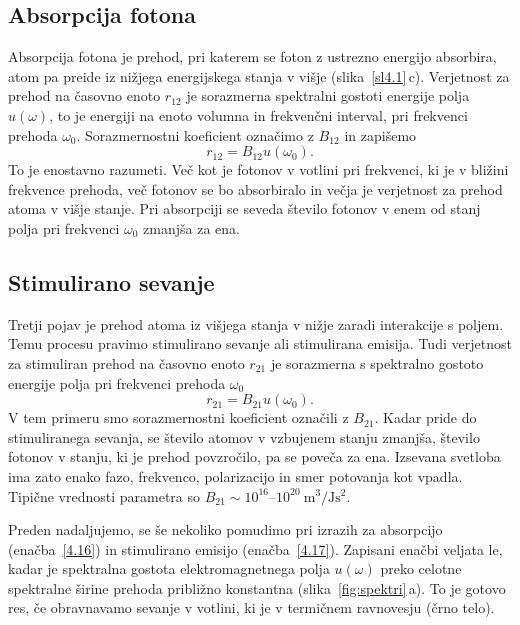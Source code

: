 \subsection*{Absorpcija fotona}
Absorpcija fotona je prehod, pri katerem se foton 
z ustrezno energijo absorbira, atom pa preide iz nižjega energijskega stanja v višje (slika~\ref{sl4.1}\,c). 
Verjetnost za prehod na časovno enoto $r_{12}$ je sorazmerna 
spektralni gostoti energije polja $u(\omega)$, to je
energiji na enoto volumna in frekvenčni interval, 
pri frekvenci prehoda $\omega_{0}$. Sorazmernostni koeficient označimo z $B_{12}$ in 
zapišemo
\begin{equation}
r_{12}=B_{12}u(\omega_{0}).
\label{4.16}
\end{equation}
To je enostavno razumeti. Več kot je fotonov v votlini pri frekvenci, ki je
v bližini frekvence prehoda, več fotonov se bo absorbiralo in večja je 
verjetnost za prehod atoma v višje stanje. Pri absorpciji se
seveda število fotonov v enem od stanj polja pri frekvenci
$\omega_{0}$ zmanjša za ena.

\subsection*{Stimulirano sevanje}
Tretji pojav je prehod atoma iz višjega stanja v nižje zaradi interakcije
s poljem. Temu procesu pravimo stimulirano sevanje ali 
stimulirana emisija. Tudi verjetnost za stimuliran prehod na časovno enoto $r_{21}$ 
je sorazmerna s spektralno gostoto energije polja pri frekvenci prehoda $\omega_{0}$
\begin{equation}
r_{21}=B_{21}u(\omega_{0}).
\label{4.17}
\end{equation}
V tem primeru smo sorazmernostni koeficient označili z $B_{21}$. Kadar pride do
stimuliranega sevanja, se število atomov v vzbujenem stanju zmanjša, 
število fotonov v stanju, ki je prehod povzročilo, pa se poveča za ena. 
Izsevana svetloba ima zato enako fazo, frekvenco, polarizacijo in smer potovanja kot 
vpadla. Tipične vrednosti parametra so $B_{21} \sim 10^{16}$--$10^{20}~\si{\metre^3/\joule\second^2}$.

Preden nadaljujemo, se še nekoliko pomudimo pri izrazih za absorpcijo
(enačba~\ref{4.16}) in stimulirano emisijo (enačba~\ref{4.17}).
Zapisani enačbi veljata le, kadar je spektralna gostota 
elektromagnetnega polja $u(\omega)$
preko celotne spektralne širine prehoda približno konstantna 
(slika~\ref{fig:spektri}\,a). To je gotovo res, če
obravnavamo sevanje v votlini, ki je v termičnem ravnovesju (črno telo). 

